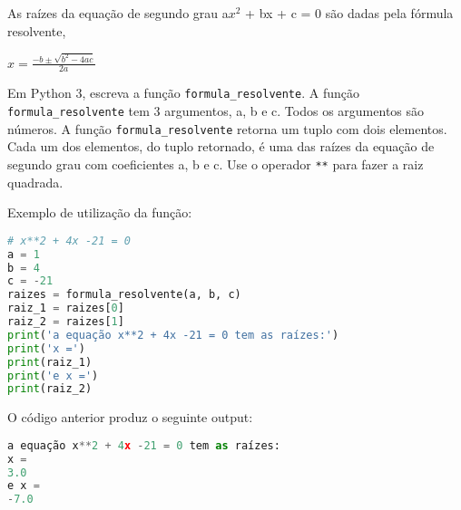 \documentclass[12pt,varwidth=16cm,border=17pt]{standalone}
\begin{document}
As raízes da equação de segundo grau a$x^{2}$ + bx + c = 0 são dadas pela
fórmula resolvente,\newline

\vfil
\LARGE

\hfil$x =\frac{-b\pm\sqrt{b^2-4ac}}{2a}$
\vfil

\normalsize
Em Python 3, escreva a função \verb+formula_resolvente+. A função \verb+formula_resolvente+
tem 3 argumentos, a, b e c. Todos os argumentos são números. A função
\verb+formula_resolvente+ retorna um tuplo com dois elementos. Cada
um dos elementos, do tuplo retornado, é uma das raízes da equação de
segundo grau com coeficientes a, b e c. Use o operador \verb+**+ para fazer a
raiz quadrada.

Exemplo de utilização da função:

\begin{lstlisting}[language=Python]
# x**2 + 4x -21 = 0
a = 1
b = 4
c = -21
raizes = formula_resolvente(a, b, c)
raiz_1 = raizes[0]
raiz_2 = raizes[1]
print('a equação x**2 + 4x -21 = 0 tem as raízes:')
print('x =')
print(raiz_1)
print('e x =')
print(raiz_2)
\end{lstlisting}

O código anterior produz o seguinte output:

\begin{lstlisting}[language=Python]
a equação x**2 + 4x -21 = 0 tem as raízes:
x =
3.0
e x =
-7.0
\end{lstlisting}
\end{document}
